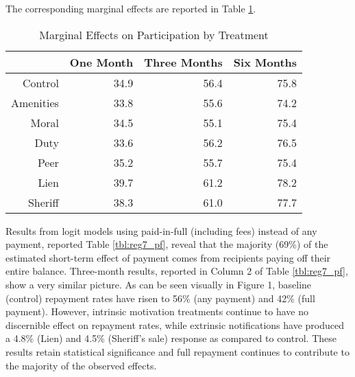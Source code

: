 \documentclass[12pt,titlepage]{article}
\begin{document}
The corresponding marginal effects are reported in Table \ref{tbl:marg}.

\begin{table}[ht]
\centering
\caption{Marginal Effects on Participation by Treatment} 
\label{tbl:marg}
\begin{tabular}{rrrr}
  \hline
 & One Month & Three Months & Six Months \\ 
  \hline
Control & 34.9 & 56.4 & 75.8 \\ 
  Amenities & 33.8 & 55.6 & 74.2 \\ 
  Moral & 34.5 & 55.1 & 75.4 \\ 
  Duty & 33.6 & 56.2 & 76.5 \\ 
  Peer & 35.2 & 55.7 & 75.4 \\ 
  Lien & 39.7 & 61.2 & 78.2 \\ 
  Sheriff & 38.3 & 61.0 & 77.7 \\ 
   \hline
\end{tabular}
\end{table}

Results from logit models using 
paid-in-full (including fees) instead of any payment, reported Table 
\ref{tbl:reg7_pf}, reveal that the majority (69\%) of the estimated 
short-term effect of payment comes from recipients paying off their entire balance.
Three-month results, reported in Column 2 of Table \ref{tbl:reg7_pf}, show a very 
similar picture. As can be seen visually in Figure 1, baseline (control) 
repayment rates have risen to 56\% (any payment) and 42\% (full payment). 
However, intrinsic motivation treatments continue to have no discernible 
effect on repayment rates, while extrinsic notifications have produced a 
4.8\% (Lien) and 4.5\% (Sheriff's sale) response as compared to control. These 
results retain statistical significance and full repayment continues to 
contribute to the majority of the observed effects.
\end{document}
